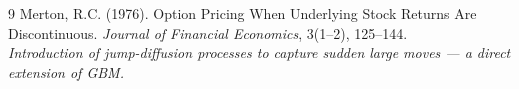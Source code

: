 \documentclass[11pt, a4paper]{article}
\begin{document}
\begin{thebibliography}{9}
  Merton, R.C. (1976).
  Option Pricing When Underlying Stock Returns Are Discontinuous.
  \emph{Journal of Financial Economics}, 3(1--2), 125--144.
  \\
  \textit{Introduction of jump-diffusion processes to capture sudden large moves — a direct extension of GBM.}

\end{thebibliography}
\end{document}
